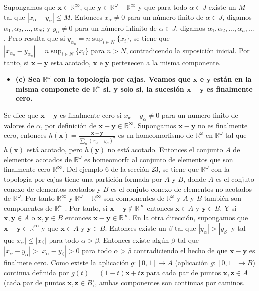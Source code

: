\documentclass{article}
\newcommand{\vect}[1]{\boldsymbol{#1}}
\begin{document}
Supongamos que $\vect{x}\in \mathbb{R}^\infty$, que $\vect{y}\in \mathbb{R}^\omega-\mathbb{R}^\infty$ y que para todo $\alpha\in J$ existe un $M $ tal que $|x_\alpha-y_\alpha|\leq M$. Entonces $x_\alpha\neq 0$ para un número finito de $\alpha\in J$, digamos $\alpha_1,\alpha_2,...,\alpha_{N}$; y $y_\alpha\neq 0$ para un número infinito de $\alpha\in J$, digamos $\alpha_1,\alpha_2,...,\alpha_n,...$. Pero resulta que si $y_{\alpha_n}=n\sup_{i\in N}\{x_i\} $, se tiene que $|x_{\alpha_n}-y_{\alpha_n}|=n\sup_{i\in N}\{x_i\} $ para  $n>N$, contradicendo la suposición inicial.
Por tanto, si $\vect{x}-\vect{y}$ esta acotado, $\vect{x}$ e $\vect{y}$ pertenecen a la misma componente.
\begin{itemize}
\item \bf (c) \rm Sea $\mathbb{R}^\omega$ con la topología por cajas. Veamos que $\vect{x}$ e $\vect{y}$ están en la misma componete de $\mathbb{R}^\omega$ si, y solo si, la sucesión $\vect{x}-\vect{y}$ es finalmente cero.
\end{itemize}
Se dice que $\vect{x}-\vect{y}$ es finalmente cero si  $x_\alpha-y_\alpha\neq 0$ para un numero finito de valores de $\alpha$, por definición de $\vect{x}-\vect{y}\in \mathbb{R}^\infty$. Supongamos $\vect{x}-\vect{y}$ no es finalmente cero, entonces $h(\vect{x})=\frac{\vect{x}-\vect{y}}{\sum_\alpha (x_\alpha-y_\alpha)^2}$ es un homeomorfismo de $\mathbb{R}^\omega$ en $\mathbb{R}^\omega$ tal que $h(\vect{x})$ está acotado, pero $h(\vect{y})$ no está acotado. Entonces el conjunto $A$ de elementos acotados de $\mathbb{R}^\omega$ es homeomorfo al conjunto de elementos que son finalmente cero $\mathbb{R}^\infty$. Del ejemplo 6 de la sección 23, se tiene que $\mathbb{R}^\omega$ con la topología por cajas tiene una partición formada por $A$ y $B$, donde $A$ es el conjuto conexo de elementos acotados y $B$ es el conjuto conexo de elementos no acotados de $\mathbb{R}^\omega$. Por tanto $\mathbb{R}^\infty$ y $\mathbb{R}^\omega-\mathbb{R}^\infty$ son componentes de $\mathbb{R}^\omega$ y $A$ y $B$ también son componentes de $\mathbb{R}^\omega$ . Por tanto, si $\vect{x}-\vect{y}\notin \mathbb{R}^\infty$ entonces $\vect{x}\in A$ y $\vect{y}\in B$. Y si $\vect{x},\vect{y}\in A$ o $\vect{x},\vect{y}\in B$ entonces $\vect{x}-\vect{y}\in \mathbb{R}^\infty$. En la otra dirección, supongamos que $\vect{x}-\vect{y}\in \mathbb{R}^\infty$ y que $\vect{x}\in A$ y $\vect{y}\in B$. Entonces existe un $\beta$ tal que $|y_\alpha|>|y_\beta|$  y tal que $x_\alpha|\leq |x_\beta|$ para todo $\alpha>\beta$. Entonces existe algún $\beta$ tal que $|x_\alpha-y_\alpha|>|x_\alpha-y_\beta|>0$ para todo $\alpha >\beta$ contradiciendo el hecho de que $\vect{x}-\vect{y}$ es finalmete cero. Como existe la aplicación $g:[0,1]\rightarrow A$    (aplicación $g:[0,1]\rightarrow B$) continua definida por $g(t)=(1-t)\vect{x}+t\vect{z}$ para cada par de puntos $\vect{x},\vect{z}\in A$ (cada par de puntos $\vect{x},\vect{z}\in B$), ambas componentes son continuas por caminos.
\end{document}
